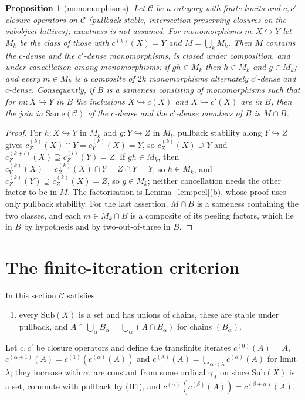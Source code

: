 \documentclass[11pt]{amsart}
\newtheorem{prop}[thm]{Proposition}
\theoremstyle{definition}
\newcommand{\Same}{\mathrm{Same}}
\newcommand{\Sub}{\mathrm{Sub}}
\newcommand{\cC}{\mathcal C}
\begin{document}
\begin{prop}[monomorphisms]\label{prop:mono}
Let $\cC$ be a category with finite limits and $c,c'$ closure operators on
$\cC$ (pullback-stable, intersection-preserving closures on the subobject
lattices); exactness is not assumed. For monomorphisms $m\colon X\hookrightarrow
Y$ let $M_k$ be the class of those with $c^{(k)}(X)=Y$ and $M=\bigcup_kM_k$.
Then $M$ contains the $c$-dense and the $c'$-dense monomorphisms, is closed
under composition, and under cancellation among monomorphisms: if $gh\in M_k$
then $h\in M_k$ and $g\in M_k$; and every $m\in M_k$ is
a composite of $2k$ monomorphisms alternately $c'$-dense and $c$-dense.
Consequently, if $B$ is a sameness consisting of monomorphisms such that for
$m\colon X\hookrightarrow Y$ in $B$ the inclusions $X\hookrightarrow c(X)$ and
$X\hookrightarrow c'(X)$ are in $B$, then the join in $\Same(\cC)$ of the
$c$-dense and the $c'$-dense members of $B$ is $M\cap B$.
\end{prop}
\begin{proof}
For $h\colon X\hookrightarrow Y$ in $M_k$ and $g\colon Y\hookrightarrow Z$ in
$M_l$, pullback stability along $Y\hookrightarrow Z$ gives
$c^{(k)}_Z(X)\cap Y=c^{(k)}_Y(X)=Y$, so $c^{(k)}_Z(X)\supseteq Y$ and
$c^{(k+l)}_Z(X)\supseteq c^{(l)}_Z(Y)=Z$. If $gh\in M_k$, then $c^{(k)}_Y(X)=c^{(k)}_Z(X)\cap Y=Z\cap Y=Y$, so
$h\in M_k$, and $c^{(k)}_Z(Y)\supseteq c^{(k)}_Z(X)=Z$, so $g\in M_k$; neither
cancellation needs the other factor to be in $M$. The
factorisation is Lemma~\ref{lem:peel}(b), whose proof uses only pullback
stability. For the last assertion, $M\cap B$ is a sameness containing the
two classes, and each $m\in M_k\cap B$ is a composite of its peeling
factors, which lie in $B$ by hypothesis and by two-out-of-three in $B$.
\end{proof}

\section{The finite-iteration criterion}\label{sec:criterion}

In this section $\cC$ satisfies
\begin{enumerate}
\item[(H1)] every $\Sub(X)$ is a set and has unions of chains, these are
stable under pullback, and $A\cap\bigcup_\alpha B_\alpha=\bigcup_\alpha(A\cap
B_\alpha)$ for chains $(B_\alpha)$.
\end{enumerate}
Let $c,c'$ be closure operators and define the transfinite iterates
$c^{(0)}(A)=A$, $c^{(\alpha+1)}(A)=c^{(1)}(c^{(\alpha)}(A))$ and
$c^{(\lambda)}(A)=\bigcup_{\alpha<\lambda}c^{(\alpha)}(A)$ for limit
$\lambda$; they increase with $\alpha$, are constant from some ordinal
$\gamma_A$ on since $\Sub(X)$ is a set, commute with pullback by (H1), and
$c^{(\alpha)}(c^{(\beta)}(A))=c^{(\beta+\alpha)}(A)$.
\end{document}
